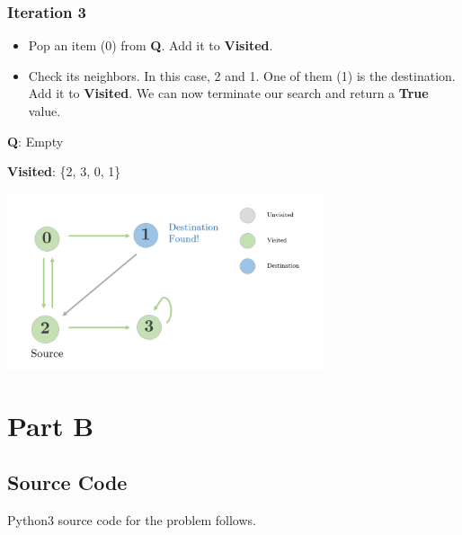 \documentclass[12pt]{article}
\begin{document}
\subsubsection*{Iteration 3}
\begin{itemize}
  \item Pop an item (0) from \textbf{Q}. Add it to \textbf{Visited}.
  \item Check its neighbors. In this case, 2 and 1. One of them (1) is the destination. Add it to \textbf{Visited}. We can now terminate our search and return a \textbf{True} value.
\end{itemize}

\textbf{Q}: Empty

\textbf{Visited}: \{2, 3, 0, 1\}

\begin{center}
    \includegraphics[width=0.7\textwidth]{3.png}
\end{center}
\pagebreak
\section*{Part B}

\subsection*{Source Code}
Python3 source code for the problem follows.
\end{document}
